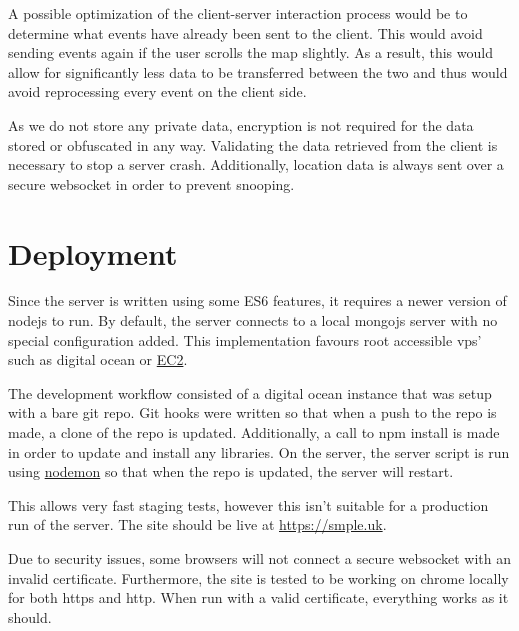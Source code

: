 \documentclass[10pt]{article}
\begin{document}
        A possible optimization of the client-server interaction process would be to determine what events have already been sent to the client. This would avoid sending events again if the user scrolls the map slightly. As a result, this would allow for significantly less data to be transferred between the two and thus would avoid reprocessing every event on the client side.

        As we do not store any private data, encryption is not required for the data stored or obfuscated in any way. Validating the data retrieved from the client is necessary to stop a server crash. Additionally, location data is always sent over a secure websocket in order to prevent snooping.

    \section{Deployment}
        Since the server is written using some ES6 features, it requires a newer version of nodejs to run. By default, the server connects to a local mongojs server with no special configuration added. This implementation favours root accessible vps' such as digital ocean or \href{https://aws.amazon.com/ec2/}{EC2}.

        The development workflow consisted of a digital ocean instance that was setup with a bare git repo. Git hooks were written so that when a push to the repo is made, a clone of the repo is updated. Additionally, a call to npm install is made in order to update and install any libraries. On the server, the server script is run using \href{https://github.com/remy/nodemon}{nodemon} so that when the repo is updated, the server will restart.  

        This allows very fast staging tests, however this isn't suitable for a production run of the server. The site should be live at \href{https://smple.uk}{https://smple.uk}.

        Due to security issues, some browsers will not connect a secure websocket with an invalid certificate. Furthermore, the site is tested to be working on chrome locally for both https and http. When run with a valid certificate, everything works as it should.
\end{document}

